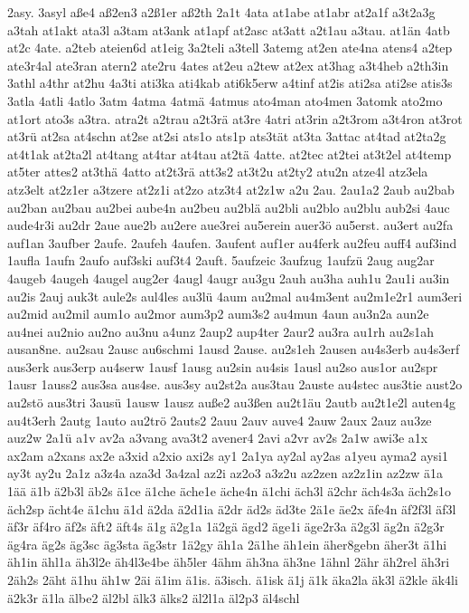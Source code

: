 {2asy.
3asyl
aße4
aß2en3
a2ß1er
aß2th
2a1t
4ata
at1abe
at1abr
at2a1f
a3t2a3g
a3tah
at1akt
ata3l
a3tam
at3ank
at1apf
at2asc
at3att
a2t1au
a3tau.
at1än
4atb
at2c
4ate.
a2teb
ateien6d
at1eig
3a2teli
a3tell
3atemg
at2en
ate4na
atens4
a2tep
ate3r4al
ate3ran
atern2
ate2ru
4ates
at2eu
a2tew
at2ex
at3hag
a3t4heb
a2th3in
3athl
a4thr
at2hu
4a3ti
ati3ka
ati4kab
ati6k5erw
a4tinf
at2is
ati2sa
ati2se
atis3s
3atla
4atli
4atlo
3atm
4atma
4atmä
4atmus
ato4man
ato4men
3atomk
ato2mo
at1ort
ato3s
a3tra.
atra2t
a2trau
a2t3rä
at3re
4atri
at3rin
a2t3rom
a3t4ron
at3rot
at3rü
at2sa
at4schn
at2se
at2si
ats1o
ats1p
ats3tät
at3ta
3attac
at4tad
at2ta2g
at4t1ak
at2ta2l
at4tang
at4tar
at4tau
at2tä
4atte.
at2tec
at2tei
at3t2el
at4temp
at5ter
attes2
at3thä
4atto
at2t3rä
att3s2
at3t2u
at2ty2
atu2n
atze4l
atz3ela
atz3elt
at2z1er
a3tzere
at2z1i
at2zo
atz3t4
at2z1w
a2u
2au.
2au1a2
2aub
au2bab
au2ban
au2bau
au2bei
aube4n
au2beu
au2blä
au2bli
au2blo
au2blu
aub2si
4auc
aude4r3i
au2dr
2aue
aue2b
au2ere
aue3rei
au5erein
auer3ö
au5erst.
au3ert
au2fa
auf1an
3aufber
2aufe.
2aufeh
4aufen.
3aufent
auf1er
au4ferk
au2feu
auff4
auf3ind
1aufla
1aufn
2aufo
auf3ski
auf3t4
2auft.
5aufzeic
3aufzug
1aufzü
2aug
aug2ar
4augeb
4augeh
4augel
aug2er
4augl
4augr
au3gu
2auh
au3ha
auh1u
2au1i
au3in
au2is
2auj
auk3t
aule2s
aul4les
au3lü
4aum
au2mal
au4m3ent
au2m1e2r1
aum3eri
au2mid
au2mil
aum1o
au2mor
aum3p2
aum3s2
au4mun
4aun
au3n2a
aun2e
au4nei
au2nio
au2no
au3nu
a4unz
2aup2
aup4ter
2aur2
au3ra
au1rh
au2s1ah
ausan8ne.
au2sau
2ausc
au6schmi
1ausd
2ause.
au2s1eh
2ausen
au4s3erb
au4s3erf
aus3erk
aus3erp
au4serw
1ausf
1ausg
au2sin
au4sis
1ausl
au2so
aus1or
au2spr
1ausr
1auss2
aus3sa
aus4se.
aus3sy
au2st2a
aus3tau
2auste
au4stec
aus3tie
aust2o
au2stö
aus3tri
3ausü
1ausw
1ausz
auße2
au3ßen
au2t1äu
2autb
au2t1e2l
auten4g
au4t3erh
2autg
1auto
au2trö
2auts2
2auu
2auv
auve4
2auw
2aux
2auz
au3ze
auz2w
2a1ü
a1v
av2a
a3vang
ava3t2
avener4
2avi
a2vr
av2s
2a1w
awi3e
a1x
ax2am
a2xans
ax2e
a3xid
a2xio
axi2s
ay1
2a1ya
ay2al
ay2as
a1yeu
ayma2
aysi1
ay3t
ay2u
2a1z
a3z4a
aza3d
3a4zal
az2i
az2o3
a3z2u
az2zen
az2z1in
az2zw
ä1a
1ää
ä1b
ä2b3l
äb2s
ä1ce
ä1che
äche1e
äche4n
ä1chi
äch3l
ä2chr
äch4s3a
äch2s1o
äch2sp
ächt4e
ä1chu
ä1d
ä2da
ä2d1ia
ä2dr
äd2s
äd3te
2ä1e
äe2x
äfe4n
äf2f3l
äf3l
äf3r
äf4ro
äf2s
äft2
äft4s
ä1g
ä2g1a
1ä2gä
ägd2
äge1i
äge2r3a
ä2g3l
äg2n
ä2g3r
äg4ra
äg2s
äg3sc
äg3sta
äg3str
1ä2gy
äh1a
2ä1he
äh1ein
äher8gebn
äher3t
ä1hi
äh1in
ähl1a
äh3l2e
äh4l3e4be
äh5ler
4ähm
äh3na
äh3ne
1ähnl
2ähr
äh2rel
äh3ri
2äh2s
2äht
ä1hu
äh1w
2äi
ä1im
ä1is.
ä3isch.
ä1isk
ä1j
ä1k
äka2la
äk3l
ä2kle
äk4li
ä2k3r
ä1la
älbe2
äl2bl
älk3
älks2
äl2l1a
äl2p3
äl4schl
}
